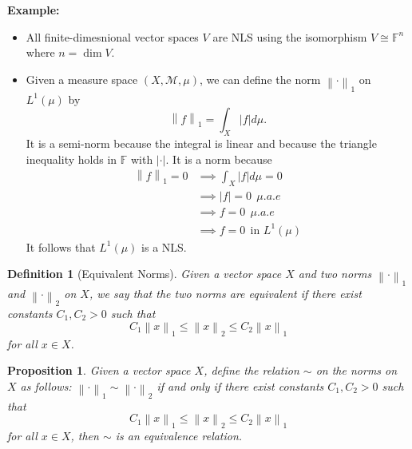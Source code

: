 \documentclass{article}
\newtheorem*{proposition}{Proposition}
\newtheorem*{definition}{Definition}
\newcommand{\F}{\mathbb{F}}
\newcommand{\M}{\mathcal{M}}
\newcommand{\lnorm}[2]{\left\lVert#2 \right\rVert_{#1}}
\newcommand{\isomorphic}{\cong}
\newenvironment{example}{\noindent\textbf{Example:} \vspace{-0.2cm}\begin{itemize}}{\end{itemize}}
\begin{document}
\begin{example}
    \item All finite-dimesnional vector spaces $V$ are NLS using the isomorphism $V \isomorphic \F^n$ where $n = \dim V$.
    \item Given a measure space $(X, \M, \mu)$, we can define the norm $\lnorm{1}{\cdot}$ on $L^1(\mu)$ by
    $$\lnorm{1}{f} = \int_X |f| d\mu.$$
    It is a semi-norm because the integral is linear and because the triangle inequality holds in $\F$ with $|\cdot|$. It is a norm because
    \begin{align*}
        \lnorm{1}{f} = 0 &\implies \int_X |f| d\mu = 0 \\
        &\implies |f| = 0 \ \ \mu.a.e \\
        &\implies f = 0 \ \ \mu.a.e \\
        &\implies f = 0 \ \ \text{in } L^1(\mu)
    \end{align*}
    It follows that $L^1(\mu)$ is a NLS.
\end{example}

\begin{definition}[Equivalent Norms]
    Given a vector space $X$ and two norms $\lnorm{1}{\cdot}$ and $\lnorm{2}{\cdot}$ on $X$, we say that the two norms are equivalent if there exist constants $C_1, C_2 > 0$ such that 
    $$C_1 \lnorm{1}{x} \leq \lnorm{2}{x} \leq C_2 \lnorm{1}{x}$$
    for all $x \in X$.
\end{definition}

\begin{proposition}
    Given a vector space $X$, define the relation $\sim$ on the norms on $X$ as follows: $\lnorm{1}{\cdot} \sim \lnorm{2}{\cdot}$ if and only if there exist constants $C_1, C_2 > 0$ such that 
    $$C_1 \lnorm{1}{x} \leq \lnorm{2}{x} \leq C_2 \lnorm{1}{x}$$
    for all $x \in X$, then $\sim$ is an equivalence relation.
\end{proposition}
\end{document}
